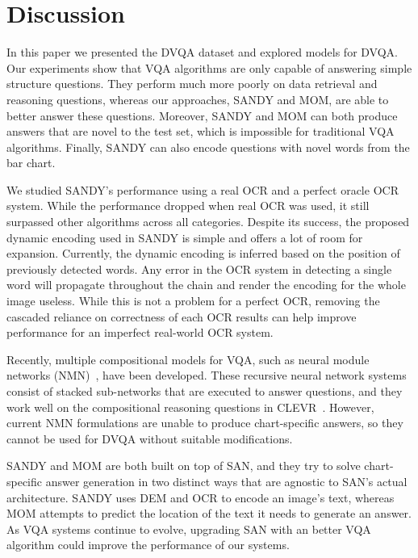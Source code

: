 \documentclass[10pt,twocolumn,letterpaper]{article}
\begin{document}
\section{Discussion}

In this paper we presented the DVQA dataset and explored models for DVQA. Our experiments show that VQA algorithms are only capable of answering simple structure questions. They perform much more poorly on data retrieval and reasoning questions, whereas our approaches, SANDY and MOM, are able to better answer these questions. Moreover, SANDY and MOM can both produce answers that are novel to the test set, which is impossible for traditional VQA algorithms. Finally, SANDY can also encode questions with novel words from the bar chart.



We studied SANDY's performance using a real OCR and a perfect oracle OCR system. While the performance dropped when real OCR was used, it still surpassed other algorithms across all categories. Despite its success, the proposed dynamic encoding used in SANDY is simple and offers a lot of room for expansion. Currently, the dynamic encoding is inferred based on the position of previously detected words. Any error in the OCR system in detecting a single word will propagate throughout the chain and render the encoding for the whole image useless. While this is not a problem for a perfect OCR, removing the cascaded reliance on correctness of each OCR results can help improve performance for an imperfect real-world OCR system.

Recently, multiple compositional models for VQA, such as neural module networks (NMN)~\cite{AndreasRDK15,andreas2016learning,hu2017learning}, have been developed. These recursive neural network systems consist of stacked sub-networks that are executed to answer questions, and they work well on the compositional reasoning questions in CLEVR~\cite{johnson2016clevr}. However, current NMN formulations are unable to produce chart-specific answers, so they cannot be used for DVQA without suitable modifications. 

SANDY and MOM are both built on top of SAN, and they try to solve chart-specific answer generation in two distinct ways that are agnostic to SAN's actual architecture. SANDY uses DEM and OCR to encode an image's text, whereas MOM attempts to predict the location of the text it needs to generate an answer. As VQA systems continue to evolve, upgrading SAN with an better VQA algorithm could improve the performance of our systems.
\end{document}
